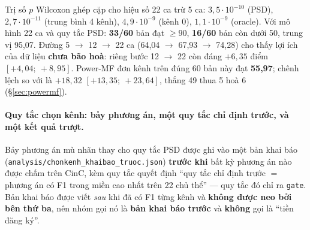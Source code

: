 Trị số $p$ Wilcoxon ghép cặp cho hiệu số 22 ca trừ 5 ca: $3{,}5 \cdot 10^{-10}$ (PSD),
$2{,}7 \cdot 10^{-11}$ (trung bình 4 kênh), $4{,}9 \cdot 10^{-9}$ (kênh 0), $1{,}1 \cdot 10^{-9}$
(oracle). Với mô hình 22 ca và quy tắc PSD: \textbf{33/60} bản đạt $\geq 90$, \textbf{16/60} bản còn
dưới 50, trung vị 95,07. Đường 5 $\to$ 12 $\to$ 22 ca (64,04 $\to$ 67,93 $\to$ 74,28) cho thấy lợi ích
của dữ liệu \textbf{chưa bão hoà}: riêng bước 12 $\to$ 22 còn đáng $+6{,}35$ điểm
$[+4{,}04;\ +8{,}95]$. Power-MF đơn kênh trên đúng 60 bản này đạt \textbf{55,97}; chênh lệch so với
\hethong{} là $+18{,}32$ $[+13{,}35;\ +23{,}64]$, thắng 49 thua 5 hoà 6 (\S\ref{sec:powermf}).

\paragraph{Quy tắc chọn kênh: bảy phương án, một quy tắc chỉ định trước, và một kết quả trượt.}
Bảy phương án mù nhãn thay cho quy tắc PSD được ghi vào một bản khai báo
(\texttt{analysis/chonkenh\_khaibao\_truoc.json}) \textbf{trước khi} bất kỳ phương án nào được chấm
trên CinC, kèm quy tắc quyết định ``quy tắc chỉ định trước $=$ phương án có F1 trong miền cao nhất trên
22 chủ thể'' --- quy tắc đó chỉ ra \texttt{gate}. Bản khai báo được viết \emph{sau} khi đã có F1 từng
kênh và \textbf{không được neo bởi bên thứ ba}, nên nhóm gọi nó là \textbf{bản khai báo trước} và
\textbf{không} gọi là ``tiền đăng ký''.

